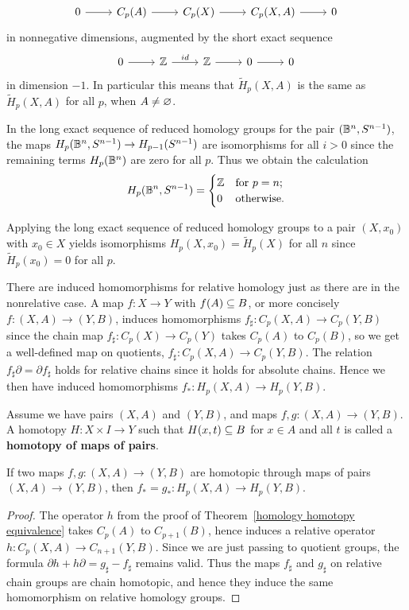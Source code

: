 \[\begin{tikzcd}
0\ar[r]&C_p(A)\ar[r]&C_p(X)\ar[r]&C_p(X,A)\ar[r]&0
\end{tikzcd}\]
in nonnegative dimensions, augmented by the short exact sequence
\[\begin{tikzcd}
0\ar[r]&\Z\ar[r,"id"]&\Z\ar[r]&0\ar[r]&0
\end{tikzcd}\]
in dimension $-1$. In particular this means that $\widetilde{H}_p(X,A)$ is the same as $\widetilde{H}_p(X,A)$ for all $p$, when $A\neq\varnothing$.
\begin{example}
In the long exact sequence of reduced homology groups for the pair $(\mathbb{B}^n,S^{n-1})$, the maps $H_p(\mathbb{B}^n,S^{n-1})\to H_{p-1}(S^{n-1})$ are isomorphisms for all $i>0$
since the remaining terms $H_p(\mathbb{B}^n)$ are zero for all $p$. Thus we obtain the calculation
\[H_p(\mathbb{B}^n,S^{n-1})=\begin{cases}
\mathbb{Z}&\text{for }p=n;\\
0&\text{otherwise}.
\end{cases}\]
\end{example}
\begin{example}
Applying the long exact sequence of reduced homology groups to a pair $(X,x_0)$ with $x_0\in X$ yields isomorphisms $H_p(X,x_0)=\widetilde{H}_p(X)$ for all $n$ since $\widetilde{H}_p(x_0)=0$ for all $p$.
\end{example}
There are induced homomorphisms for relative homology just as there are in the nonrelative case. A map $f:X\to Y$ with $f(A)\subseteq B$, or more concisely $f:(X,A)\to (Y,B)$, induces homomorphisms $f_\sharp:C_p(X,A)\to C_p(Y,B)$ since the chain
map $f_\sharp:C_p(X)\to C_p(Y)$ takes $C_p(A)$ to $C_p(B)$, so we get a well-defined map on quotients, $f_\sharp:C_p(X,A)\to C_p(Y,B)$. The relation $f_\sharp\partial=\partial f_\sharp$ holds for relative chains since it holds for absolute chains. Hence we then have induced homomorphisms $f_*:H_p(X,A)\to H_p(Y,B)$.
\begin{definition}
Assume we have pairs $(X,A)$ and $(Y, B)$, and maps $f,g:(X,A)\to (Y,B)$. A homotopy $H:X\times I\to Y$ such that $H(x,t)\subseteq B$ for $x\in A$ and all $t$ is called a \textbf{homotopy of maps of pairs}.
\end{definition}
\begin{proposition}
If two maps $f,g:(X,A)\to (Y,B)$ are homotopic through maps of
pairs $(X,A)\to(Y, B)$, then $f_*=g_*:H_p(X,A)\to H_p(Y,B)$.
\end{proposition}
\begin{proof}
The operator $h$ from the proof of Theorem~\ref{homology homotopy equivalence} takes $C_p(A)$ to $C_{p+1}(B)$, hence induces a relative operator $h:C_p(X,A)\to C_{n+1}(Y,B)$. Since we are just passing to quotient groups, the formula $\partial h+h\partial=g_\sharp-f_\sharp$ remains valid. Thus the maps $f_\sharp$ and $g_\sharp$ on relative chain groups are chain homotopic, and hence they induce the same homomorphism on relative homology groups.
\end{proof}
